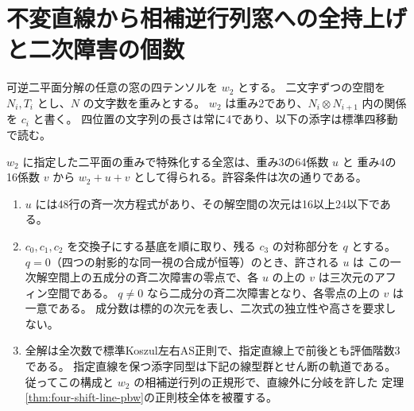\section{不変直線から相補逆行列窓への全持上げと二次障害の個数}
\label{sec:invariant-line-filtered-lifts}
可逆二平面分解の任意の窓の四テンソルを $w_2$ とする。
二文字ずつの空間を $N_i,T_i$ とし、$N$ の文字数を重みとする。
$w_2$ は重み2であり、$N_i\otimes N_{i+1}$ 内の関係を $c_i$ と書く。
四位置の文字列の長さは常に4であり、以下の添字は標準四移動で読む。

\begin{theorem}\label{thm:invariant-line-filtered-lifts}
$w_2$ に指定した二平面の重みで特殊化する全窓は、重み3の64係数 $u$ と
重み4の16係数 $v$ から $w_2+u+v$ として得られる。許容条件は次の通りである。
\begin{enumerate}
\item $u$ には48行の斉一次方程式があり、その解空間の次元は16以上24以下である。
\item $c_0,c_1,c_2$ を交換子にする基底を順に取り、残る $c_3$ の対称部分を $q$ とする。
$q=0$（四つの射影的な同一視の合成が恒等）のとき、許される $u$ は
この一次解空間上の五成分の斉二次障害の零点で、各 $u$ の上の $v$ は三次元のアフィン空間である。
$q\ne0$ なら二成分の斉二次障害となり、各零点の上の $v$ は一意である。
成分数は標的の次元を表し、二次式の独立性や高さを要求しない。
\item 全解は全次数で標準Koszul左右AS正則で、指定直線上で前後とも評価階数3である。
指定直線を保つ添字同型は下記の線型群とせん断の軌道である。
従ってこの構成と $w_2$ の相補逆行列の正規形で、直線外に分岐を許した
定理\ref{thm:four-shift-line-pbw}の正則枝全体を被覆する。
\end{enumerate}
\end{theorem}
